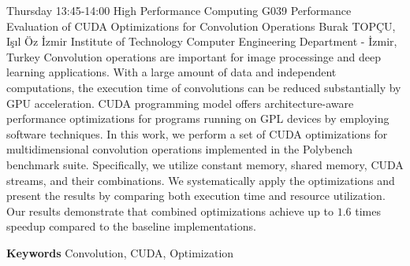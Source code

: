 
    \begin{abstract_basarim}
    {Thursday 13:45-14:00}
    {High Performance Computing}
    {G039}
    {Performance Evaluation of CUDA Optimizations for Convolution Operations}
    {%
    Burak TOPÇU, Işıl Öz}
    {%
    }
    {%
    İzmir Institute of Technology Computer Engineering Department - İzmir, Turkey}
    Convolution operations are important for image processinge and deep learning applications. With a large amount of data and independent computations, the execution time of convolutions can be reduced substantially by GPU acceleration. CUDA programming model offers architecture-aware performance optimizations for programs running on GPL devices by employing software techniques. In this work, we perform a set of CUDA optimizations for multidimensional convolution operations implemented in the Polybench benchmark suite. Specifically, we utilize constant memory, shared memory, CUDA streams, and their combinations. We systematically apply the optimizations and present the results by comparing both execution time and resource utilization. Our results demonstrate that combined optimizations achieve up to $1.6$ times speedup compared to the baseline implementations. 
    
        \textbf{Keywords} \newline{}Convolution, CUDA, Optimization
    \end{abstract_basarim}
    
